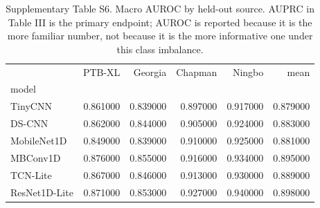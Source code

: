 \begin{table}
\caption{Supplementary Table S6. Macro AUROC by held-out source. AUPRC in Table III is the primary endpoint; AUROC is reported because it is the more familiar number, not because it is the more informative one under this class imbalance.}
\begin{tabular}{lrrrrr}
\toprule
 & PTB-XL & Georgia & Chapman & Ningbo & mean \\
model &  &  &  &  &  \\
\midrule
TinyCNN & 0.861000 & 0.839000 & 0.897000 & 0.917000 & 0.879000 \\
DS-CNN & 0.862000 & 0.844000 & 0.905000 & 0.924000 & 0.883000 \\
MobileNet1D & 0.849000 & 0.839000 & 0.910000 & 0.925000 & 0.881000 \\
MBConv1D & 0.876000 & 0.855000 & 0.916000 & 0.934000 & 0.895000 \\
TCN-Lite & 0.867000 & 0.846000 & 0.913000 & 0.930000 & 0.889000 \\
ResNet1D-Lite & 0.871000 & 0.853000 & 0.927000 & 0.940000 & 0.898000 \\
\bottomrule
\end{tabular}
\end{table}
